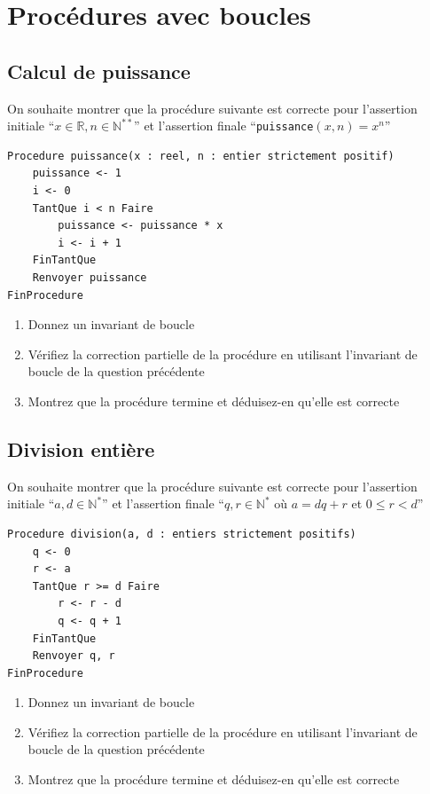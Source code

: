 \documentclass[a4paper,11pt]{article}
\begin{document}
\section{Procédures avec boucles}

\subsection{Calcul de puissance}

On souhaite montrer que la procédure suivante est correcte pour l'assertion initiale ``$x \in \mathbb{R}, n \in \mathbb{N}^{**}$'' et l'assertion finale ``\texttt{puissance}$(x,n) = x^n$''

\begin{lstlisting}
Procedure puissance(x : reel, n : entier strictement positif)
    puissance <- 1
    i <- 0
    TantQue i < n Faire
        puissance <- puissance * x
        i <- i + 1
    FinTantQue
    Renvoyer puissance
FinProcedure
\end{lstlisting}

\begin{enumerate}
\item Donnez un invariant de boucle

\item Vérifiez la correction partielle de la procédure en utilisant l'invariant de boucle de la question précédente

\item Montrez que la procédure termine et déduisez-en qu'elle est correcte
\end{enumerate}

\subsection{Division entière}

On souhaite montrer que la procédure suivante est correcte pour l'assertion initiale ``$a, d \in \mathbb{N}^*$'' et l'assertion finale ``$q, r \in \mathbb{N}^*$ où $a = dq + r$ et $0 \leq r < d$''

\begin{lstlisting}
Procedure division(a, d : entiers strictement positifs)
    q <- 0
    r <- a
    TantQue r >= d Faire
        r <- r - d
        q <- q + 1
    FinTantQue
    Renvoyer q, r
FinProcedure
\end{lstlisting}

\begin{enumerate}
\item Donnez un invariant de boucle

\item Vérifiez la correction partielle de la procédure en utilisant l'invariant de boucle de la question précédente

\item Montrez que la procédure termine et déduisez-en qu'elle est correcte
\end{enumerate}
\end{document}
